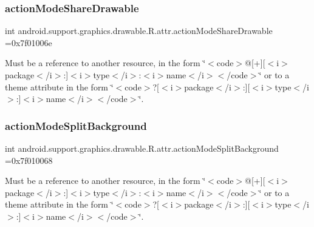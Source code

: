 \subsubsection{\texorpdfstring{action\+Mode\+Share\+Drawable}{actionModeShareDrawable}}
{\footnotesize\ttfamily int android.\+support.\+graphics.\+drawable.\+R.\+attr.\+action\+Mode\+Share\+Drawable =0x7f01006e\hspace{0.3cm}{\ttfamily [static]}}

Must be a reference to another resource, in the form \char`\"{}$<$code$>$@\mbox{[}+\mbox{]}\mbox{[}$<$i$>$package$<$/i$>$\+:\mbox{]}$<$i$>$type$<$/i$>$\+:$<$i$>$name$<$/i$>$$<$/code$>$\char`\"{} or to a theme attribute in the form \char`\"{}$<$code$>$?\mbox{[}$<$i$>$package$<$/i$>$\+:\mbox{]}\mbox{[}$<$i$>$type$<$/i$>$\+:\mbox{]}$<$i$>$name$<$/i$>$$<$/code$>$\char`\"{}. \mbox{\label{classandroid_1_1support_1_1graphics_1_1drawable_1_1R_1_1attr_ab9c17048bac1f6caafeb5ca7f4d2acf7}} 
\subsubsection{\texorpdfstring{action\+Mode\+Split\+Background}{actionModeSplitBackground}}
{\footnotesize\ttfamily int android.\+support.\+graphics.\+drawable.\+R.\+attr.\+action\+Mode\+Split\+Background =0x7f010068\hspace{0.3cm}{\ttfamily [static]}}

Must be a reference to another resource, in the form \char`\"{}$<$code$>$@\mbox{[}+\mbox{]}\mbox{[}$<$i$>$package$<$/i$>$\+:\mbox{]}$<$i$>$type$<$/i$>$\+:$<$i$>$name$<$/i$>$$<$/code$>$\char`\"{} or to a theme attribute in the form \char`\"{}$<$code$>$?\mbox{[}$<$i$>$package$<$/i$>$\+:\mbox{]}\mbox{[}$<$i$>$type$<$/i$>$\+:\mbox{]}$<$i$>$name$<$/i$>$$<$/code$>$\char`\"{}. \mbox{\label{classandroid_1_1support_1_1graphics_1_1drawable_1_1R_1_1attr_a490a08bb7c9badca16fa3c3409ef0f6c}} 
